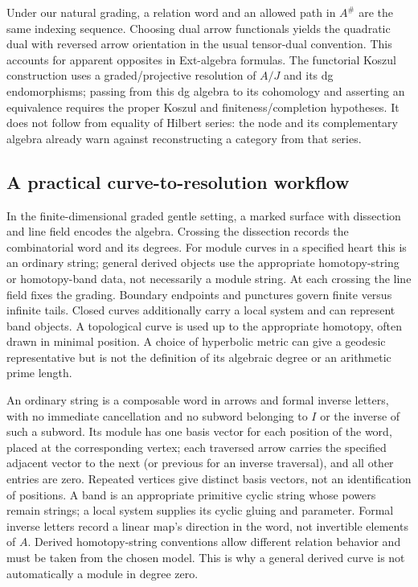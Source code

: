 Under our natural grading, a relation word and an allowed path in $A^\#$ are the same indexing sequence. Choosing dual arrow functionals yields the quadratic dual with reversed arrow orientation in the usual tensor-dual convention. This accounts for apparent opposites in Ext-algebra formulas. The functorial Koszul construction uses a graded/projective resolution of $A/J$ and its dg endomorphisms; passing from this dg algebra to its cohomology and asserting an equivalence requires the proper Koszul and finiteness/completion hypotheses. It does not follow from equality of Hilbert series: the node and its complementary algebra already warn against reconstructing a category from that series.

\subsection{A practical curve-to-resolution workflow}
In the finite-dimensional graded gentle setting, a marked surface with dissection and line field encodes the algebra. Crossing the dissection records the combinatorial word and its degrees. For module curves in a specified heart this is an ordinary string; general derived objects use the appropriate homotopy-string or homotopy-band data, not necessarily a module string. At each crossing the line field fixes the grading. Boundary endpoints and punctures govern finite versus infinite tails. Closed curves additionally carry a local system and can represent band objects. A topological curve is used up to the appropriate homotopy, often drawn in minimal position. A choice of hyperbolic metric can give a geodesic representative but is not the definition of its algebraic degree or an arithmetic prime length.

An ordinary string is a composable word in arrows and formal inverse letters, with no immediate cancellation and no subword belonging to $I$ or the inverse of such a subword. Its module has one basis vector for each position of the word, placed at the corresponding vertex; each traversed arrow carries the specified adjacent vector to the next (or previous for an inverse traversal), and all other entries are zero. Repeated vertices give distinct basis vectors, not an identification of positions. A band is an appropriate primitive cyclic string whose powers remain strings; a local system supplies its cyclic gluing and parameter. Formal inverse letters record a linear map's direction in the word, not invertible elements of $A$. Derived homotopy-string conventions allow different relation behavior and must be taken from the chosen model. This is why a general derived curve is not automatically a module in degree zero.

